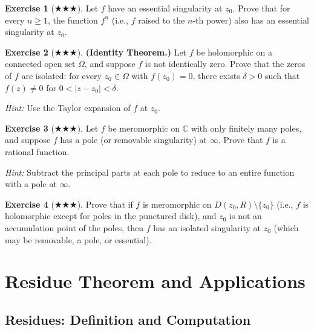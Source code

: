 \documentclass[12pt,a4paper,openany]{book}
\theoremstyle{definition}
\newtheorem{exercise}{Exercise}[chapter]
\theoremstyle{plain}
\theoremstyle{remark}
\newcommand{\C}{\mathbb{C}}
\newcommand{\abs}[1]{\left|#1\right|}
\begin{document}
\begin{exercise}[$\bigstar\!\bigstar\!\bigstar$]\label{exo:essential-dense}
Let $f$ have an essential singularity at $z_0$. Prove that for every $n\ge 1$,
the function $f^n$ (i.e., $f$ raised to the $n$-th power) also has an essential
singularity at $z_0$.
\end{exercise}

\begin{exercise}[$\bigstar\!\bigstar\!\bigstar$]\label{exo:isolated-zeros}
\textbf{(Identity Theorem.)}
Let $f$ be holomorphic on a connected open set $\Omega$, and suppose $f$ is not
identically zero. Prove that the zeros of $f$ are isolated: for every $z_0\in\Omega$
with $f(z_0)=0$, there exists $\delta>0$ such that $f(z)\ne 0$ for
$0<\abs{z-z_0}<\delta$.

\textit{Hint:} Use the Taylor expansion of $f$ at $z_0$.
\end{exercise}

\begin{exercise}[$\bigstar\!\bigstar\!\bigstar$]\label{exo:meromorphic-rational}
Let $f$ be meromorphic on $\C$ with only finitely many poles, and suppose $f$ has
a pole (or removable singularity) at $\infty$. Prove that $f$ is a rational
function.

\textit{Hint:} Subtract the principal parts at each pole to reduce to an entire
function with a pole at $\infty$.
\end{exercise}

\begin{exercise}[$\bigstar\!\bigstar\!\bigstar$]\label{exo:weierstrass-no-essential}
Prove that if $f$ is meromorphic on $D(z_0,R)\setminus\{z_0\}$ (i.e., $f$ is
holomorphic except for poles in the punctured disk), and $z_0$ is not an
accumulation point of the poles, then $f$ has an isolated singularity at $z_0$
(which may be removable, a pole, or essential).
\end{exercise}
\chapter{Residue Theorem and Applications}\label{ch:residues}

\section{Residues: Definition and Computation}\label{sec:residue-def}
\end{document}
